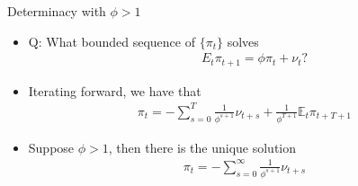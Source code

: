\documentclass[9pt,xcolor={dvipsnames}]{beamer}
\newcommand{\bit}{\begin{itemize}}
\newcommand{\eit}{\end{itemize}}
\begin{document}
\begin{frame}{Determinacy with $\phi>1$}

\bit
\setlength\itemsep{1.5em}

\item Q: What bounded sequence of $\{\pi_t\}$ solves 
\begin{eqnarray}
&& E_t \pi_{t+1} = \phi \pi_t + \nu_t? \nonumber
\end{eqnarray}


\item Iterating forward, we have that
\begin{eqnarray}
\pi_t = -\sum_{s=0}^{T} \frac{1}{\phi^{s+1}} \nu_{t+s}  + \frac{1}{\phi^{T+1}} \mathbb E_t \pi_{t+T+1} \nonumber
\end{eqnarray}

\item Suppose $\phi>1$, then there is the unique solution
\begin{eqnarray}
\pi_t = -\sum_{s=0}^{\infty} \frac{1}{\phi^{s+1}} \nu_{t+s}  \nonumber
\end{eqnarray}


\eit

\end{frame}
\end{document}
